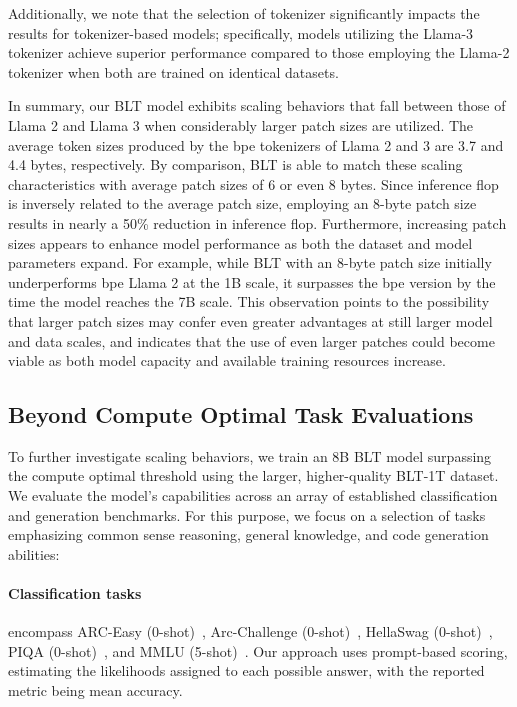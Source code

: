 Additionally, we note that the selection of tokenizer significantly impacts the results for tokenizer-based models; specifically, models utilizing the Llama-3 tokenizer achieve superior performance compared to those employing the Llama-2 tokenizer when both are trained on identical datasets.

In summary, our {\textsc BLT} model exhibits scaling behaviors that fall between those of Llama 2 and Llama 3 when considerably larger patch sizes are utilized. The average token sizes produced by the bpe tokenizers of Llama 2 and 3 are 3.7 and 4.4 bytes, respectively. By comparison, {\textsc BLT} is able to match these scaling characteristics with average patch sizes of 6 or even 8 bytes. Since inference flop is inversely related to the average patch size, employing an 8-byte patch size results in nearly a 50\% reduction in inference flop. Furthermore, increasing patch sizes appears to enhance model performance as both the dataset and model parameters expand. For example, while {\textsc BLT} with an 8-byte patch size initially underperforms bpe Llama 2 at the 1B scale, it surpasses the bpe version by the time the model reaches the 7B scale. This observation points to the possibility that larger patch sizes may confer even greater advantages at still larger model and data scales, and indicates that the use of even larger patches could become viable as both model capacity and available training resources increase.

\subsection{Beyond Compute Optimal Task Evaluations}
\label{section:evals}
To further investigate scaling behaviors, we train an 8B {\textsc BLT} model surpassing the compute optimal threshold using the larger, higher-quality {\textsc BLT}-1T dataset. We evaluate the model’s capabilities across an array of established classification and generation benchmarks. For this purpose, we focus on a selection of tasks emphasizing common sense reasoning, general knowledge, and code generation abilities:
\paragraph{Classification tasks} encompass ARC-Easy (0-shot)~\citep{Eval_ARC}, Arc-Challenge (0-shot)~\citep{Eval_ARC}, HellaSwag (0-shot)~\citep{Eval_hellaswag}, PIQA (0-shot)~\citep{Eval_piqa}, and MMLU (5-shot)~\citep{hendrycks2020measuring}. Our approach uses prompt-based scoring, estimating the likelihoods assigned to each possible answer, with the reported metric being mean accuracy.
